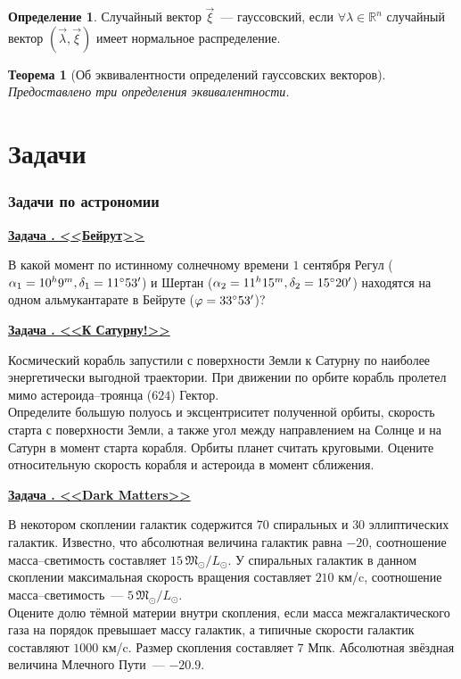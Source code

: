 \documentclass[11pt]{article}
\newtheorem{thm}{Теорема}[section]
\theoremstyle{definition}\newtheorem{defi}{Определение}
\newcounter{taskn}[section]
\newenvironment{task}[1]{%
\begin{framed}
  \noindent
  \underline{\bfseries Задача \stepcounter{taskn}\thetaskn. <<#1>>}
  \setlength{\parindent}{0cm}
}{%
\end{framed}
}
\begin{document}
\begin{defi}

Случайный вектор $\vec \xi$~--- гауссовский, если $\forall \lambda \in \mathbb{R}^n$ случайный вектор $(\vec \lambda, \vec \xi)$ имеет нормальное распределение.

\end{defi}

\begin{thm}[Об эквивалентности определений гауссовских векторов]

Предоставлено три определения эквивалентности.

\end{thm}


\part{Задачи}

\section{Задачи по астрономии}

\begin{task}{Бейрут}

В какой момент по истинному солнечному времени $1$ сентября Регул ($\alpha_1 = 10^h 9^m, \delta_1 = 11\degree 53'$) и Шертан ($\alpha_2 = 11^h 15^m, \delta_2 = 15 \degree 20'$) находятся на одном альмукантарате в Бейруте ($\varphi = 33 \degree 53'$)?

\end{task}

\begin{task}{К Сатурну!}

Космический корабль запустили с поверхности Земли к Сатурну по наиболее энергетически выгодной траектории. При движении по орбите корабль пролетел мимо астероида--троянца ($624$) Гектор.\\[10pt]
Определите большую полуось и эксцентриситет полученной орбиты, скорость старта с поверхности Земли, а также угол между направлением на Солнце и на Сатурн в момент старта корабля. Орбиты планет считать круговыми. Оцените относительную скорость корабля и астероида в момент сближения.

\end{task}

\begin{task}{Dark Matters}

В некотором скоплении галактик содержится $70$ спиральных и $30$ эллиптических галактик. Известно, что абсолютная величина галактик равна $-20$, соотношение масса--светимость составляет $15 \, \mathfrak{M}_\odot / L_\odot$. У спиральных галактик в данном скоплении максимальная скорость вращения составляет $210$ км/c, соотношение масса--светимость~--- $5 \, \mathfrak{M}_\odot / L_\odot$.\\[10pt]
Оцените долю тёмной материи внутри скопления, если масса межгалактического газа на порядок превышает массу галактик, а типичные скорости галактик составляют $1000$ км/c. Размер скопления составляет $7$ Мпк. Абсолютная звёздная величина Млечного Пути~--- $-20.9$.

\end{task}
\end{document}

